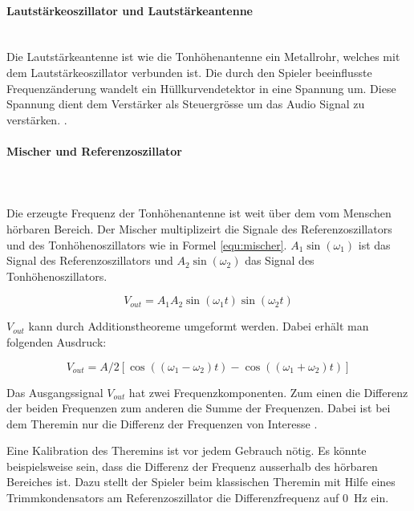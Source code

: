 \paragraph{Lautstärkeoszillator und Lautstärkeantenne}\mbox{}\\ 

Die Lautstärkeantenne ist wie die Tonhöhenantenne ein Metallrohr, welches mit dem Lautstärkeoszillator verbunden ist. Die durch den Spieler beeinflusste Frequenzänderung wandelt ein Hüllkurvendetektor in eine Spannung um. Diese Spannung dient dem Verstärker als Steuergrösse um das Audio Signal zu verstärken. \cite{Franzis}. 

\paragraph{Mischer und Referenzoszillator}\mbox{}\\ 
\\Die erzeugte Frequenz der Tonhöhenantenne ist weit über dem vom Menschen hörbaren Bereich. Der Mischer multiplizeirt die Signale des Referenzoszillators und des Tonhöhenoszillators wie in Formel \ref{equ:mischer}. $A_1\sin(\omega_1)$ ist das Signal des Referenzoszillators und $A_2\sin(\omega_2)$ das Signal des Tonhöhenoszillators.

\begin{equation}
V_{out} = A_{1}A_{2} \sin(\omega_{1}t)   \sin(\omega_{2}t) 
\label{equ:mischer}
\end{equation}

$V_{out}$ kann durch Additionstheoreme umgeformt werden. Dabei erhält man folgenden Ausdruck:

\begin{equation}
V_{out} = A/2[\cos((\omega_{1}-\omega_{2})t)  - \cos((\omega_{1}+\omega_{2})t) ]
\label{equ:mischer_trigo}
\end{equation}

Das Ausgangssignal $V_{out}$ hat zwei Frequenzkomponenten. Zum einen die Differenz der beiden Frequenzen zum anderen die Summe der Frequenzen. Dabei ist bei dem Theremin nur die Differenz der Frequenzen von Interesse \cite{physik_theremin}.

Eine Kalibration des Theremins ist vor jedem Gebrauch nötig. Es könnte beispielsweise sein, dass die Differenz der Frequenz ausserhalb des hörbaren Bereiches ist. Dazu stellt der Spieler beim klassischen Theremin mit Hilfe eines Trimmkondensators am Referenzoszillator die Differenzfrequenz auf \SI{0}{Hz} ein.

